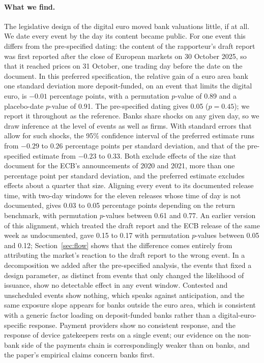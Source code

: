 \documentclass[11pt]{article}
\theoremstyle{plain}\newtheorem{proposition}{Proposition}
\begin{document}
\paragraph{What we find.} The legislative design of the digital euro moved bank valuations little, if at all. We date every event by the day its content became public. For one event this differs from the pre-specified dating: the content of the rapporteur's draft report was first reported after the close of European markets on 30 October 2025, so that it reached prices on 31 October, one trading day before the date on the document. In this preferred specification, the relative gain of a euro area bank one standard deviation more deposit-funded, on an event that limits the digital euro, is $-0.01$ percentage points, with a permutation $p$-value of 0.89 and a placebo-date $p$-value of 0.91. The pre-specified dating gives 0.05 ($p = 0.45$); we report it throughout as the reference. Banks share shocks on any given day, so we draw inference at the level of events as well as firms. With standard errors that allow for such shocks, the 95\% confidence interval of the preferred estimate runs from $-0.29$ to $0.26$ percentage points per standard deviation, and that of the pre-specified estimate from $-0.23$ to $0.33$. Both exclude effects of the size that \citet{burlon2024} document for the ECB's announcements of 2020 and 2021, more than one percentage point per standard deviation, and the preferred estimate excludes effects about a quarter that size. Aligning every event to its documented release time, with two-day windows for the eleven releases whose time of day is not documented, gives 0.03 to 0.05 percentage points depending on the return benchmark, with permutation $p$-values between 0.61 and 0.77. An earlier version of this alignment, which treated the draft report and the ECB release of the same week as undocumented, gave 0.15 to 0.17 with permutation $p$-values between 0.05 and 0.12; Section~\ref{sec:flow} shows that the difference comes entirely from attributing the market's reaction to the draft report to the wrong event. In a decomposition we added after the pre-specified analysis, the events that fixed a design parameter, as distinct from events that only changed the likelihood of issuance, show no detectable effect in any event window. Contested and unscheduled events show nothing, which speaks against anticipation, and the same exposure slope appears for banks outside the euro area, which is consistent with a generic factor loading on deposit-funded banks rather than a digital-euro-specific response. Payment providers show no consistent response, and the response of device gatekeepers rests on a single event; our evidence on the non-bank side of the payments chain is correspondingly weaker than on banks, and the paper's empirical claims concern banks first.
\end{document}
